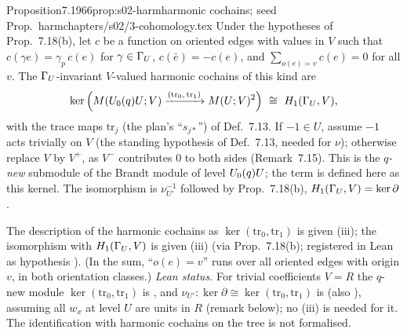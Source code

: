 \begin{quoted}{Proposition}{7.19}{66}{prop:s02-harm}{harmonic cochains; seed Prop.~harm}{chapters/s02/3-cohomology.tex}\label{rpt:prop:s02-harm}
Under the hypotheses of Prop.~7.18(b), let $c$ be a function on oriented edges with values in $V$
such that $c(\gamma e)=\gamma_p\,c(e)$ for $\gamma\in\Gamma_U$, $c(\bar e)=-c(e)$, and $\sum_{o(e)=v}c(e)=0$ for all
$v$. The $\Gamma_U$-invariant $V$-valued harmonic cochains of this kind are
\[\ker\Big(\Brandt{\Uzero{q}U}{V}\xrightarrow{(\mathrm{tr}_0,\,\mathrm{tr}_1)}\Brandt{U}{V}^{2}\Big)\ \cong\ H_1(\GU,V),\]
with the trace maps $\mathrm{tr}_j$ (the plan's ``$s_{j*}$'') of Def.~7.13. If $-1\in U$, assume $-1$ acts trivially on $V$
(the standing hypothesis of Def.~7.13, needed for $\nu$); otherwise replace $V$ by $V^+$, as $V^-$ contributes $0$ to both sides
(Remark~7.15). This is the \emph{$q$-new} submodule of the Brandt
module of level $U_0(q)U$; the term is defined here as this kernel. The isomorphism is $\nu_{U'}^{-1}$ followed by
Prop.~7.18(b), $H_1(\Gamma_U,V)=\ker\partial$.
\par\smallskip{}\par
\noindent The description of the harmonic cochains as $\ker(\mathrm{tr}_0,\mathrm{tr}_1)$ is \stproved{} given (iii); the isomorphism with
$H_1(\Gamma_U,V)$ is \stpmc{} given (iii) (via Prop.~7.18(b); registered in Lean as hypothesis ). (In
the sum, ``$o(e)=v$'' runs over all oriented edges with origin $v$, in both orientation classes.)
\emph{Lean status.} For trivial coefficients $V=R$ the $q$-new module $\ker(\mathrm{tr}_0,\mathrm{tr}_1)$ is
, and $\nu_{U'}:\ker\partial\cong\ker(\mathrm{tr}_0,\mathrm{tr}_1)$ is \stformal{}
 (also ), assuming all $w_x$
at level $U$ are units in $R$ (remark below); no (iii) is needed for it. The identification with harmonic cochains on the tree is not
formalised.
\end{quoted}
